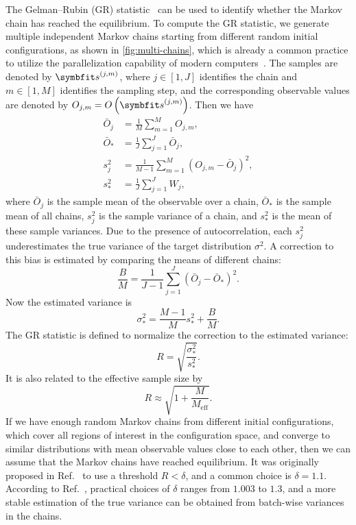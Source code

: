The Gelman--Rubin (GR) statistic~\cite{gelman1992inference, vats2021revisiting} can be used to identify whether the Markov chain has reached the equilibrium. To compute the GR statistic, we generate multiple independent Markov chains starting from different random initial configurations, as shown in \cref{fig:multi-chains}, which is already a common practice to utilize the parallelization capability of modern computers~\cite{lee2010utility}. The samples are denoted by $\vs^{(j, m)}$, where $j \in [1, J]$ identifies the chain and $m \in [1, M]$ identifies the sampling step, and the corresponding observable values are denoted by $O_{j, m} = O\left( \vs^{(j, m)} \right)$. Then we have
\begin{align}
\bar{O}_j &= \frac{1}{M} \sum_{m = 1}^M O_{j, m}, \\
\bar{O}_* &= \frac{1}{J} \sum_{j = 1}^J \bar{O}_j, \\
s^2_j &= \frac{1}{M - 1} \sum_{m = 1}^M (O_{j, m} - \bar{O}_j)^2, \\
s^2_* &= \frac{1}{J} \sum_{j = 1}^J W_j,
\end{align}
where $\bar{O}_j$ is the sample mean of the observable over a chain, $\bar{O}_*$ is the sample mean of all chains, $s^2_j$ is the sample variance of a chain, and $s^2_*$ is the mean of these sample variances. Due to the presence of autocorrelation, each $s^2_j$ underestimates the true variance of the target distribution $\sigma^2$. A correction to this bias is estimated by comparing the means of different chains:
\begin{equation}
\frac{B}{M} = \frac{1}{J - 1} \sum_{j = 1}^J (\bar{O}_j - \bar{O}_*)^2.
\end{equation}
Now the estimated variance is
\begin{equation}
\sigma^2_* = \frac{M - 1}{M} s^2_* + \frac{B}{M}.
\end{equation}
The GR statistic is defined to normalize the correction to the estimated variance:
\begin{equation}
R = \sqrt{\frac{\sigma^2_*}{s^2_*}}.
\end{equation}
It is also related to the effective sample size by
\begin{equation}
R \approx \sqrt{1 + \frac{M}{M_\text{eff}}}.
\end{equation}
If we have enough random Markov chains from different initial configurations, which cover all regions of interest in the configuration space, and converge to similar distributions with mean observable values close to each other, then we can assume that the Markov chains have reached equilibrium. It was originally proposed in Ref.~\cite{gelman1992inference} to use a threshold $R < \delta$, and a common choice is $\delta = 1.1$. According to Ref.~\cite{vats2021revisiting}, practical choices of $\delta$ ranges from $1.003$ to $1.3$, and a more stable estimation of the true variance can be obtained from batch-wise variances in the chains.


